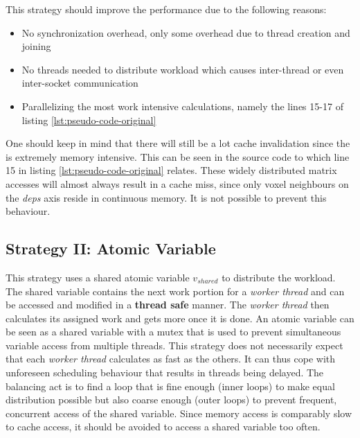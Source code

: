 This strategy should improve the performance due to the following reasons:
\begin{itemize}
    \item No synchronization overhead, only some overhead due to thread creation and joining
    \item No threads needed to distribute workload which causes inter-thread or even inter-socket communication
    \item Parallelizing the most work intensive calculations, namely the lines 15-17 of listing \ref{lst:pseudo-code-original}
\end{itemize}

One should keep in mind that there will still be a lot cache invalidation since the \hb{} is extremely memory intensive. This can be seen in the source code to which line 15 in listing \ref{lst:pseudo-code-original} relates. These widely distributed matrix accesses will almost always result in a cache miss, since only voxel neighbours on the \textit{deps} axis reside in continuous memory. It is not possible to prevent this behaviour.


\subsection{Strategy II: Atomic Variable}
\label{ssec:strategy-ii}

This strategy uses a shared atomic variable $v_{shared}$ to distribute the workload. The shared variable contains the next work portion for a \textit{worker thread} and can be accessed and modified in a \textbf{thread safe} manner. The \textit{worker thread} then calculates its assigned work and gets more once it is done. An atomic variable can be seen as a shared variable with a mutex that is used to prevent simultaneous variable access from multiple threads.
This strategy does not necessarily expect that each \textit{worker thread} calculates as fast as the others. It can thus cope with unforeseen scheduling behaviour that results in threads being delayed. The balancing act is to find a loop that is fine enough (inner loops) to make equal distribution possible but also coarse enough (outer loops) to prevent frequent, concurrent access of the shared variable. Since memory access is comparably slow to cache access, it should be avoided to access a shared variable too often.

